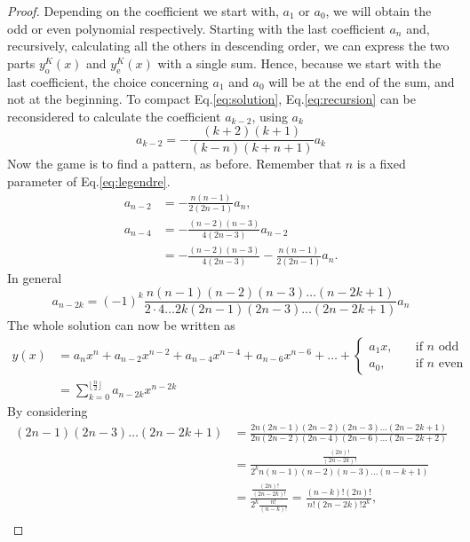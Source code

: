 \begin{proof}
    Depending on the coefficient we start with, $a_1$ or $a_0$, we will obtain the odd or even polynomial respectively. Starting with the last coefficient $a_n$ and, recursively, calculating all the others in descending order, we can express the two parts $y_\text{o}^K(x)$ and $y_\text{e}^K(x)$ with a single sum. Hence, because we start with the last coefficient, the choice concerning $a_1$ and $a_0$ will be at the end of the sum, and not at the beginning. To compact Eq.\eqref{eq:solution}, Eq.\eqref{eq:recursion} can be reconsidered to calculate the coefficient $a_{k-2}$, using $a_k$
    \begin{equation*}
    a_{k-2} = -\frac{(k+2)(k+1)}{(k-n)(k+n+1)}a_k
    \end{equation*}
    Now the game is to find a pattern, as before. Remember that $n$ is a fixed parameter of Eq.\eqref{eq:legendre}.  
    \begin{align*}
    a_{n-2} &= -\frac{n(n-1)}{2(2n-1)}a_n, \\
    a_{n-4} &= -\frac{(n-2)(n-3)}{4(2n-3)}a_{n-2} \\
    &= -\frac{(n-2)(n-3)}{4(2n-3)}-\frac{n(n-1)}{2(2n-1)}a_n.
    \end{align*}
    In general 
    \begin{equation}\label{eq:general_recursion}
    a_{n-2k} = (-1)^k \frac{n(n-1)(n-2)(n-3) \hdots (n-2k+1)}{2\cdot4\hdots 2k(2n-1)(2n-3)\hdots(2n-2k+1)}a_n
    \end{equation}
    The whole solution can now be written as
    \begin{align}
    y(x) &= a_n x^n + a_{n-2} x^{n-2} + a_{n-4} x^{n-4} + a_{n-6} x^{n-6} + \hdots + \begin{cases} 
    a_1 x, \quad &\text{if } n \text{ odd} \\ 
    a_0, \quad  &\text{if } n \text{ even} 
    \end{cases} \nonumber \\
    &= \sum_{k=0}^{\lfloor \frac{n}{2} \rfloor} a_{n-2k}x^{n-2k} \label{eq:solution_2}
    \end{align}
    By considering
    \begin{align}
    (2n-1)(2n-3)\hdots (2n-2k+1)&=\frac{2n(2n-1)(2n-2)(2n-3)\hdots(2n-2k+1)}
    {2n(2n-2)(2n-4)(2n-6)\hdots(2n-2k+2)} \nonumber \\ 
    &=\frac{\frac{(2n)!}{(2n-2k)!}}
    {2^kn(n-1)(n-2)(n-3)\hdots(n-k+1)} \nonumber \\
    &=\frac{\frac{(2n)!}{(2n-2k)!}}
    {2^k\frac{n!}{(n-k)!}}=\frac{(n-k)!(2n)!}{n!(2n-2k)!2^k} \label{eq:1_sub_recursion}, \\

\end{align}
\end{proof}
